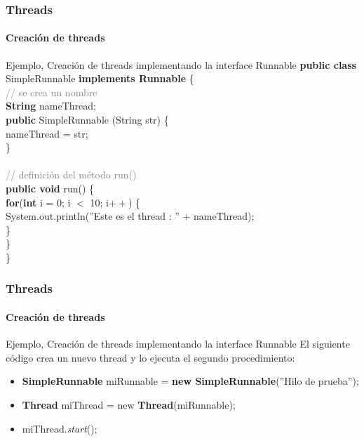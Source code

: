 \documentclass{beamer}
\begin{document}
	\begin{frame}
		\frametitle{Threads}
		\framesubtitle{Creaci\'on de threads}

		\begin{block}{Ejemplo, Creaci\'on de threads implementando la interface Runnable}
        		\textbf{public class} SimpleRunnable \textbf{implements Runnable} \{ \\        
            \hspace*{10pt}\textcolor{gray}{// se crea un nombre} \\
            \hspace*{10pt}\textbf{String} nameThread; \\
            \hspace*{10pt}\textbf{public} SimpleRunnable (String str) \{ \\
            \hspace*{20pt}nameThread = str;\\
            \hspace*{10pt}\} \\ ~\\
            \hspace*{10pt}\textcolor{gray}{// definici\'on del m\'etodo run()}\\
            \hspace*{10pt}\textbf{public void} run() \{\\
            \hspace*{20pt}\textbf{for}(\textbf{int} i = 0; i $<$ 10; i$++$) \{\\
            \hspace*{30pt}System.out.println(''Este es el thread : '' + nameThread);\\
            \hspace*{20pt}\} \\
            \hspace*{10pt}\} \\
            \}
        \end{block}
	\end{frame}
	
	\begin{frame}
		\frametitle{Threads}
		\framesubtitle{Creaci\'on de threads}

        \begin{block}{Ejemplo, Creaci\'on de threads implementando la interface Runnable}
            El siguiente c\'odigo crea un nuevo thread y lo ejecuta el segundo procedimiento:
            \begin{itemize}
                \item[] \textbf{SimpleRunnable} miRunnable = \textbf{new SimpleRunnable}(''Hilo de prueba'');
                \item[] \textbf{Thread} miThread = new \textbf{Thread}(miRunnable);
                \item[] miThread.\emph{start}();
            \end{itemize}
        \end{block}
	\end{frame}
	
\end{document}
